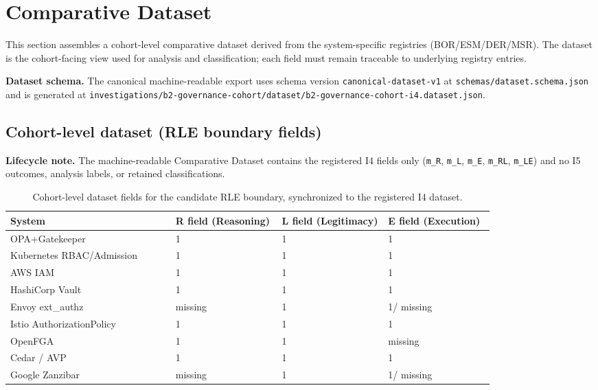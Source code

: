 \section{Comparative Dataset}
\label{sec:comparative-dataset}
This section assembles a cohort-level comparative dataset derived from the system-specific registries (BOR/ESM/DER/MSR). The dataset is the cohort-facing view used for analysis and classification; each field must remain traceable to underlying registry entries.

\textbf{Dataset schema.} The canonical machine-readable export uses schema version \texttt{canonical-dataset-v1} at \texttt{schemas/dataset.schema.json} and is generated at \texttt{investigations/b2-governance-cohort/dataset/b2-governance-cohort-i4.dataset.json}.

\subsection{Cohort-level dataset (RLE boundary fields)}
\textbf{Lifecycle note.} The machine-readable Comparative Dataset contains the registered I4 fields only (\texttt{m\_R}, \texttt{m\_L}, \texttt{m\_E}, \texttt{m\_RL}, \texttt{m\_LE}) and no I5 outcomes, analysis labels, or retained classifications.

\begin{table}[ht]
\centering
\begin{tabular}{@{}p{0.28\linewidth}p{0.18\linewidth}p{0.18\linewidth}p{0.18\linewidth}@{}}
\toprule
System & R field (Reasoning) & L field (Legitimacy) & E field (Execution) \\
\midrule
OPA+Gatekeeper & 1 & 1 & 1 \\
Kubernetes RBAC/Admission & 1 & 1 & 1 \\
AWS IAM & 1 & 1 & 1 \\
HashiCorp Vault & 1 & 1 & 1 \\
Envoy ext\_authz & missing & 1 & 1/ missing \\
Istio AuthorizationPolicy & 1 & 1 & 1 \\
OpenFGA & 1 & 1 & missing \\
Cedar / AVP & 1 & 1 & 1 \\
Google Zanzibar & missing & 1 & 1/ missing \\
\bottomrule
\end{tabular}
\caption{Cohort-level dataset fields for the candidate RLE boundary, synchronized to the registered I4 dataset.}
\end{table}


